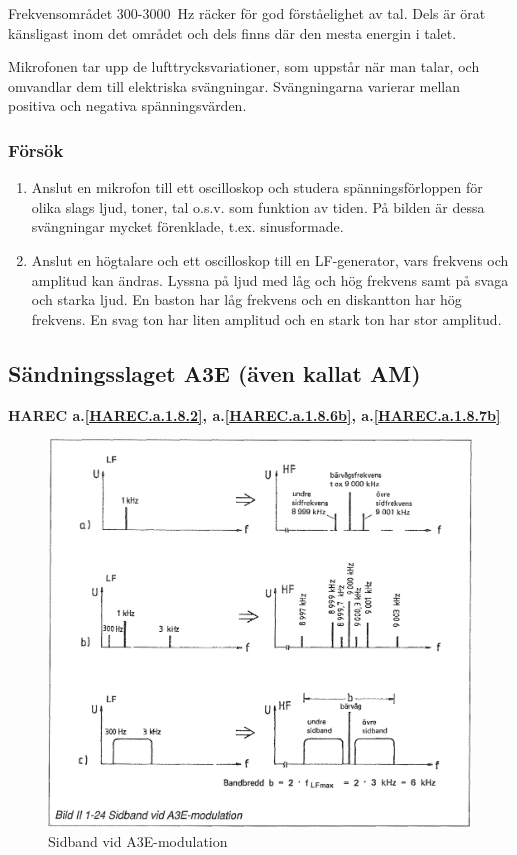 Frekvensområdet 300-3000~Hz räcker för god förståelighet av tal. Dels är örat
känsligast inom det området och dels finns där den mesta energin i talet.

Mikrofonen tar upp de lufttrycksvariationer, som uppstår när man talar, och
omvandlar dem till elektriska svängningar. Svängningarna varierar mellan
positiva och negativa spänningsvärden.

\subsubsection{Försök}

\begin{enumerate}
\item Anslut en mikrofon till ett oscilloskop och studera spänningsförloppen
för olika slags ljud, toner, tal o.s.v. som funktion av tiden. På bilden är
dessa svängningar mycket förenklade, t.ex. sinusformade.

\item Anslut en högtalare och ett oscilloskop till en LF-generator, vars
frekvens och amplitud kan ändras. Lyssna på ljud med låg och hög frekvens samt
på svaga och starka ljud. En baston har låg frekvens och en diskantton har hög
frekvens. En svag ton har liten amplitud och en stark ton har stor amplitud.
\end{enumerate}

\subsection{Sändningsslaget A3E (även kallat AM)}
\textbf{HAREC a.\ref{HAREC.a.1.8.2}, a.\ref{HAREC.a.1.8.6b}, a.\ref{HAREC.a.1.8.7b}\label{myHAREC.a.1.8.2}\label{myHAREC.a.1.8.6b}\label{myHAREC.a.1.8.7b}}

\begin{figure}
\includegraphics[width=\textwidth]{images/bild_2_1-24}
\caption{Sidband vid A3E-modulation}
\label{fig:BildII1-24}
\end{figure}

